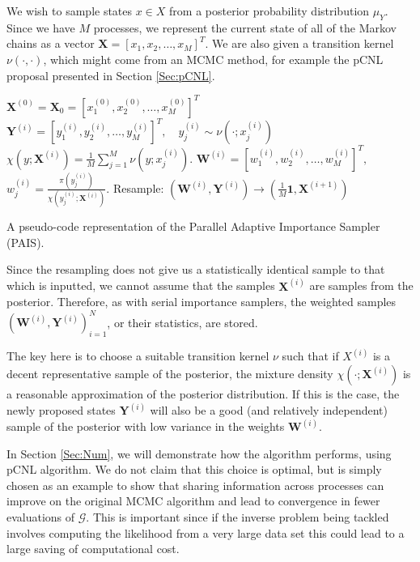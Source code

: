 \documentclass[final]{siamltex}
\newcommand{\G}{\mathcal{G}}
\newcommand{\X}{{\mathbf X}}
\newcommand{\Y}{{\mathbf Y}}
\newcommand{\W}{{\mathbf W}}
\begin{document}
We wish to sample states $x \in X$ from a posterior
probability distribution $\mu_Y$. Since we have $M$ processes, we
represent the current state of all of the Markov chains as a vector
$\X = [x_1,x_2,\ldots,x_M]^T$. We are also given a transition kernel
$\nu(\cdot,\cdot)$, which might come from an MCMC method, for example
the pCNL proposal presented in Section \ref{Sec:pCNL}.

\begin{table}
\begin{mdframed}
\begin{algorithmic}
\STATE $\X^{(0)} = \X_0 = [x_1^{(0)},x_2^{(0)},\ldots,x_M^{(0)}]^T$
\STATE $\Y^{(i)} = [y_1^{(i)},y_2^{(i)},\ldots,y_M^{(i)}]^T, \quad y_j^{(i)} \sim
\nu(\cdot;x_j^{(i)})$
\STATE $\chi(y;\X^{(i)}) = \frac{1}{M}
\sum_{j=1}^M \nu(y;x_j^{(i)})$.
\STATE $\W^{(i)} = [w_1^{(i)},w_2^{(i)},\ldots,w_M^{(i)}]^T,$ \quad $w^{(i)}_j =
\frac{\pi(y_j^{(i)})}{\chi(y_j^{(i)};\X^{(i)})}$.
\STATE Resample: $(\W^{(i)},\Y^{(i)}) \rightarrow (\frac{1}{M}\mathbf{1}, \X^{(i+1)})$
\ENDFOR 
\end{algorithmic}
\end{mdframed}

\caption{A pseudo-code representation of the Parallel Adaptive
  Importance Sampler (PAIS).}
\label{tab:PAIS}
\end{table}

Since the resampling does not give us a statistically identical sample
to that which is inputted, we cannot assume that the samples $\X^{(i)}$
are samples from the posterior. Therefore, as with serial
importance samplers, the weighted samples
$(\W^{(i)},\Y^{(i)})_{i=1}^N$, or their statistics, are stored.

The key here is to choose a suitable transition kernel $\nu$ such that
if $X^{(i)}$ is a decent representative sample of the posterior,
the mixture density $\chi(\cdot;\X^{(i)})$ is a reasonable
approximation of the posterior distribution. If this is the case,
the newly proposed states $\Y^{(i)}$ will also be a good (and relatively
independent) sample of the posterior with low variance in the
weights $\W^{(i)}$.

In Section \ref{Sec:Num}, we will demonstrate how the algorithm
performs, using pCNL algorithm. We do not claim that this choice is optimal, but
is simply chosen as an example to show that sharing information across
processes can improve on the original MCMC algorithm and lead to
convergence in fewer evaluations of $\G$. This is important since if
the inverse problem being tackled involves computing
the likelihood from a very large data set this could lead to a
large saving of computational cost.
\end{document}
